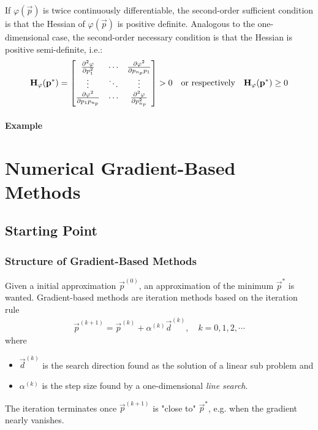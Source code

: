 			If \(\varphi(\vec{p})\) is twice continuously differentiable, the second-order sufficient condition is that the Hessian of \(\varphi(\vec{p})\) is positive definite. Analogous to the one-dimensional case, the second-order necessary condition is that the Hessian is positive semi-definite, i.e.:
			\begin{align*}
				\boldsymbol{\mathrm{H}}_\varphi(\boldsymbol{\mathrm{p}}^\ast) =
					\begin{bmatrix}
						\pdv[2]{\varphi}{p_1}        & \cdots & \pdv{\varphi^2}{p_{n_p} p_1} \\
						\vdots                       & \ddots & \vdots                       \\
						\pdv{\varphi^2}{p_1 p_{n_p}} & \cdots & \pdv[2]{\varphi}{p_{n_p}}
					\end{bmatrix}
				> 0
				\quad\text{or respectively}\quad
				\boldsymbol{\mathrm{H}}_\varphi(\boldsymbol{\mathrm{p}}^\ast) \geq 0
			\end{align*}

			\paragraph{Example} %

	\section{Numerical Gradient-Based Methods}
		\subsection{Starting Point}
			\subsubsection{Structure of Gradient-Based Methods}
				Given a initial approximation \( \vec{p}^{(0)} \), an approximation of the minimum \( \vec{p}^\ast \) is wanted. Gradient-based methods are iteration methods based on the iteration rule
				\begin{align*}
					\vec{p}^{(k + 1)} = \vec{p}^{(k)} + \alpha^{(k)} \vec{d}^{(k)},\quad k = 0, 1, 2, \cdots
				\end{align*}
				where
				\begin{itemize}
					\item \(\vec{d}^{(k)}\) is the search direction found as the solution of a linear sub problem and
					\item \(\alpha^{(k)}\) is the step size found by a one-dimensional \emph{line search}.
				\end{itemize}
				The iteration terminates once \( \vec{p}^{(k + 1)} \) is "close to" \(\vec{p}^\ast\), e.g. when the gradient nearly vanishes.


